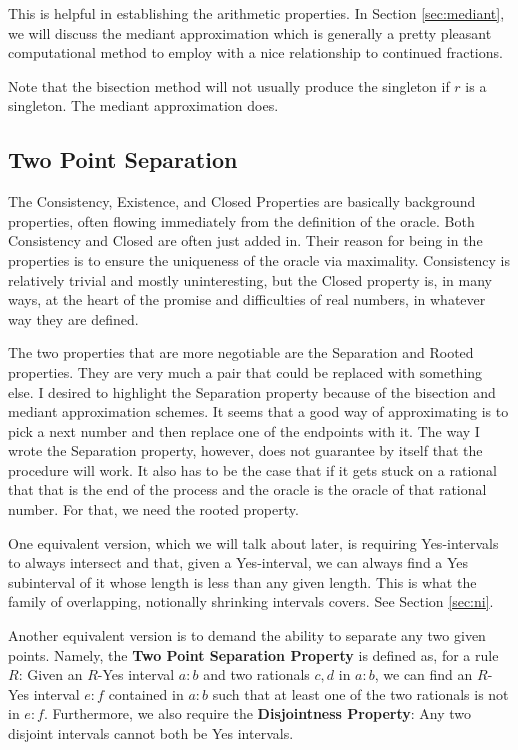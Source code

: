 \documentclass[12pt]{article}
\begin{document}
This is helpful in establishing the arithmetic properties. In Section \ref{sec:mediant}, we will discuss the mediant approximation which is generally a pretty pleasant computational method to employ with a nice relationship to continued fractions. 

Note that the bisection method will not usually produce the singleton if $r$ is a singleton. The mediant approximation does. 

\subsection{Two Point Separation}

The Consistency, Existence, and Closed Properties are basically background properties, often flowing immediately from the definition of the oracle. Both Consistency and Closed are often just added in. Their reason for being in the properties is to ensure the uniqueness of the oracle via maximality. Consistency is relatively trivial and mostly uninteresting, but the Closed property is, in many ways, at the heart of the promise and difficulties of real numbers, in whatever way they are defined. 

The two properties that are more negotiable are the Separation and Rooted properties. They are very much a pair that could be replaced with something else. I desired to highlight the Separation property because of the bisection and mediant approximation schemes. It seems that a good way of approximating is to pick a next number and then replace one of the endpoints with it. The way I wrote the Separation property, however, does not guarantee by itself that the procedure will work. It also has to be the case that if it gets stuck on a rational that that is the end of the process and the oracle is the oracle of that rational number. For that, we need the rooted property. 

One equivalent version, which we will talk about later, is requiring Yes-intervals to always intersect and that, given a Yes-interval, we can always find a Yes subinterval of it whose length is less than any given length. This is what the family of overlapping, notionally shrinking intervals covers. See Section \ref{sec:ni}.

Another equivalent version is to demand the ability to separate any two given points. Namely, the \textbf{Two Point Separation Property} is defined as, for a rule $R$: Given an $R$-Yes interval $a:b$ and two rationals $c,d$ in $a:b$, we can find an $R$-Yes interval $e:f$ contained in $a:b$ such that at least one of the two rationals is not in $e:f$. Furthermore, we also require the \textbf{Disjointness Property}: Any two disjoint intervals cannot both be Yes intervals. 
\end{document}
